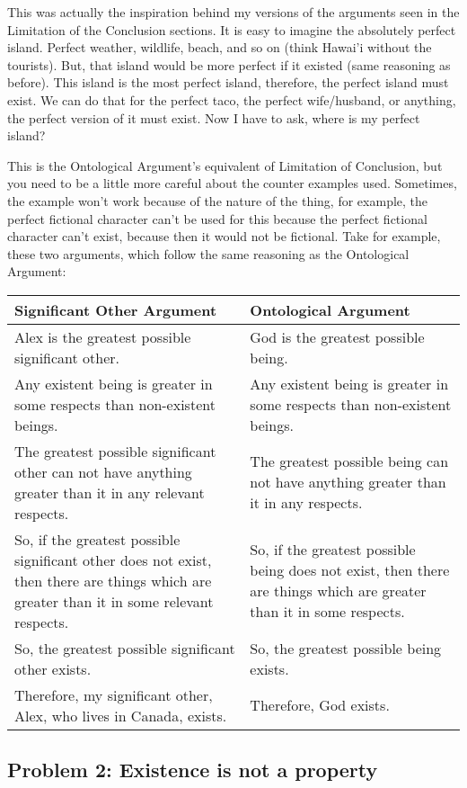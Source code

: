 This was actually the inspiration behind my versions of the arguments seen in the Limitation of the Conclusion sections. It is easy to imagine the absolutely perfect island. Perfect weather, wildlife, beach, and so on (think Hawai’i without the tourists). But, that island would be more perfect if it existed (same reasoning as before). This island is the most perfect island, therefore, the perfect island must exist. We can do that for the perfect taco, the perfect wife/husband, or anything, the perfect version of it must exist. Now I have to ask, where is my perfect island?

This is the Ontological Argument's equivalent of Limitation of Conclusion, but you need to be a little more careful about the counter examples used.  Sometimes, the example won't work because of the nature of the thing, for example, the perfect fictional character can't be used for this because the perfect fictional character can't exist, because then it would not be fictional. Take for example, these two arguments, which follow the same reasoning as the Ontological Argument:
\noindent
\begin{tabular}{p{2.75in}|p{2.75in}}
Significant Other Argument&Ontological Argument\\\hline
    Alex is the greatest possible significant other.&God is the greatest possible being.\\
    Any existent being is greater in some respects than non-existent beings.&Any existent being is greater in some respects than non-existent beings.\\
    The greatest possible significant other can not have anything greater than it in any relevant respects.&The greatest possible being can not have anything greater than it in any respects.\\
    So, if the greatest possible significant other does not exist, then there are things which are greater than it in some relevant respects.&So, if the greatest possible being does not exist, then there are things which are greater than it in some respects.\\
    So, the greatest possible significant other exists.&So, the greatest possible being exists.\\
    Therefore, my significant other, Alex, who lives in Canada, exists.&Therefore, God exists.\\
\end{tabular}
 
\subsection{Problem 2: Existence is not a property}

